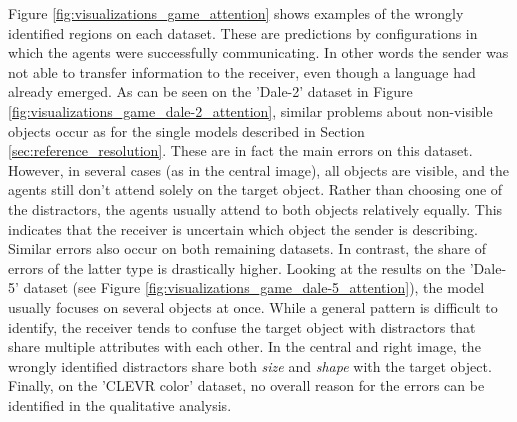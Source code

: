 Figure \ref{fig:visualizations_game_attention} shows examples of the wrongly identified regions on each dataset.
These are predictions by configurations in which the agents were successfully communicating.
In other words the sender was not able to transfer information to the receiver, even though a language had already emerged.
As can be seen on the 'Dale-2' dataset in Figure \ref{fig:visualizations_game_dale-2_attention}, similar problems about non-visible objects occur as for the single models described in Section \ref{sec:reference_resolution}.
These are in fact the main errors on this dataset.
However, in several cases (as in the central image), all objects are visible, and the agents still don't attend solely on the target object.
Rather than choosing one of the distractors, the agents usually attend to both objects relatively equally.
This indicates that the receiver is uncertain which object the sender is describing.
Similar errors also occur on both remaining datasets.
In contrast, the share of errors of the latter type is drastically higher.
Looking at the results on the 'Dale-5' dataset (see Figure \ref{fig:visualizations_game_dale-5_attention}), the model usually focuses on several objects at once.
While a general pattern is difficult to identify, the receiver tends to confuse the target object with distractors that share multiple attributes with each other.
In the central and right image, the wrongly identified distractors share both \emph{size} and \emph{shape} with the target object.
Finally, on the 'CLEVR color' dataset, no overall reason for the errors can be identified in the qualitative analysis.

